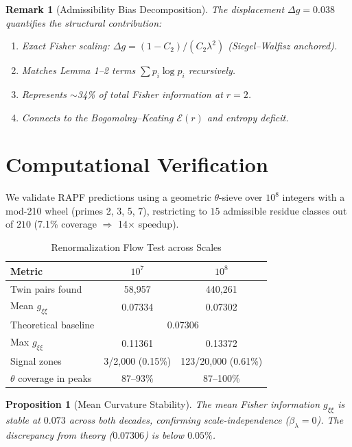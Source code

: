 \documentclass[12pt]{article}
\newtheorem{proposition}[theorem]{Proposition}
\newtheorem{remark}[theorem]{Remark}
\begin{document}
\begin{remark}[Admissibility Bias Decomposition]
The displacement $\Delta g = 0.038$ quantifies the structural contribution:
\begin{enumerate}
  \item Exact Fisher scaling: $\Delta g = (1-C_2)/(C_2\lambda^2)$ (Siegel--Walfisz anchored).
  \item Matches Lemma 1--2 terms $\sum p_i \log p_i$ recursively.
  \item Represents $\sim$34\% of total Fisher information at $r=2$.
  \item Connects to the Bogomolny--Keating $\mathcal{E}(r)$ and entropy deficit.
\end{enumerate}
\end{remark}

\section{Computational Verification}
\label{sec:computation}

We validate RAPF predictions using a geometric $\theta$-sieve over $10^8$
integers with a mod-210 wheel (primes 2, 3, 5, 7), restricting to $15$
admissible residue classes out of $210$ (7.1\% coverage $\Rightarrow$ 14$\times$ speedup).

\begin{table}[htbp]
\centering
\caption{Renormalization Flow Test across Scales}
\label{tab:renormalization}
\begin{tabular}{lcc}
\hline
\textbf{Metric} & \textbf{$10^7$} & \textbf{$10^8$} \\
\hline
Twin pairs found & 58,957 & 440,261 \\
Mean $g_{\xi\xi}$ & 0.07334 & 0.07302 \\
Theoretical baseline & \multicolumn{2}{c}{0.07306} \\
Max $g_{\xi\xi}$ & 0.11361 & 0.13372 \\
Signal zones & 3/2,000 (0.15\%) & 123/20,000 (0.61\%) \\
$\theta$ coverage in peaks & 87--93\% & 87--100\% \\
\hline
\end{tabular}
\end{table}

\begin{proposition}[Mean Curvature Stability]
The mean Fisher information $g_{\xi\xi}$ is stable at $0.073$ across both
decades, confirming scale-independence ($\beta_\lambda = 0$). The discrepancy
from theory ($0.07306$) is below $0.05\%$.
\end{proposition}
\end{document}
